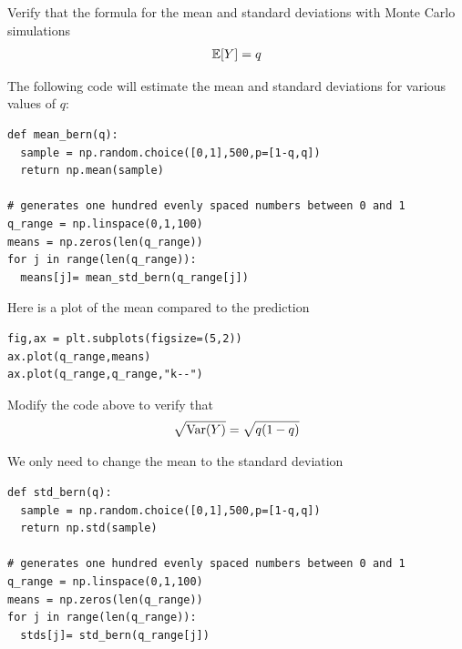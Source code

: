 \begin{example}
Verify that the formula for the mean and standard deviations with Monte Carlo simulations
\begin{align}\label{eq:bern_sts}
\mathbb E[Y] = q
\end{align}
\end{example}

\begin{solution}
The following code will estimate the mean and standard deviations for various values of $q$:
\begin{Verbatim}
def mean_bern(q):
  sample = np.random.choice([0,1],500,p=[1-q,q])
  return np.mean(sample)

# generates one hundred evenly spaced numbers between 0 and 1
q_range = np.linspace(0,1,100)
means = np.zeros(len(q_range))
for j in range(len(q_range)):
  means[j]= mean_std_bern(q_range[j])
\end{Verbatim}
Here is a plot of the mean compared to the prediction
\begin{Verbatim}
fig,ax = plt.subplots(figsize=(5,2))
ax.plot(q_range,means)
ax.plot(q_range,q_range,"k--")
\end{Verbatim}

\end{solution}


\begin{exercise}
Modify the code above to verify that
\begin{equation}
 \sqrt{{\rm Var}(Y)} = \sqrt{q(1-q)}
\end{equation}
\end{exercise}
\begin{solution}
We only need to change the mean to the standard deviation
\begin{Verbatim}
def std_bern(q):
  sample = np.random.choice([0,1],500,p=[1-q,q])
  return np.std(sample)

# generates one hundred evenly spaced numbers between 0 and 1
q_range = np.linspace(0,1,100)
means = np.zeros(len(q_range))
for j in range(len(q_range)):
  stds[j]= std_bern(q_range[j])
\end{Verbatim}
\end{solution}










